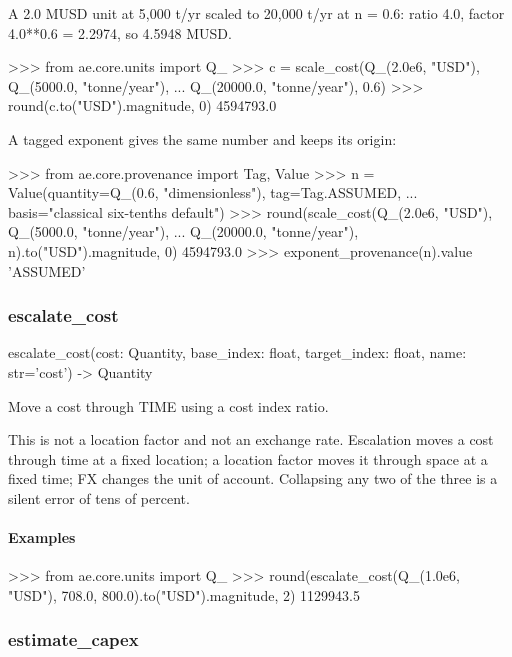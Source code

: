 \documentclass[10pt,a4paper,twoside]{report}
\begin{document}
A 2.0 MUSD unit at 5,000 t/yr scaled to 20,000 t/yr at n = 0.6: ratio 4.0, factor 4.0**0.6 = 2.2974, so 4.5948 MUSD.

\begin{doctestblock}
>>> from ae.core.units import Q_
>>> c = scale_cost(Q_(2.0e6, "USD"), Q_(5000.0, "tonne/year"),
...                Q_(20000.0, "tonne/year"), 0.6)
>>> round(c.to("USD").magnitude, 0)
4594793.0
\end{doctestblock}

A tagged exponent gives the same number and keeps its origin:

\begin{doctestblock}
>>> from ae.core.provenance import Tag, Value
>>> n = Value(quantity=Q_(0.6, "dimensionless"), tag=Tag.ASSUMED,
...           basis="classical six-tenths default")
>>> round(scale_cost(Q_(2.0e6, "USD"), Q_(5000.0, "tonne/year"),
...                  Q_(20000.0, "tonne/year"), n).to("USD").magnitude, 0)
4594793.0
>>> exponent_provenance(n).value
'ASSUMED'
\end{doctestblock}

\subsubsection*{escalate\_cost}

\begin{verbatimsmall}
escalate_cost(cost: Quantity, base_index: float, target_index: float, name: str='cost') -> Quantity
\end{verbatimsmall}

Move a cost through TIME using a cost index ratio.

This is not a location factor and not an exchange rate. Escalation moves a cost through time at a fixed location; a location factor moves it through space at a fixed time; FX changes the unit of account. Collapsing any two of the three is a silent error of tens of percent.

\paragraph*{Examples}

\begin{doctestblock}
>>> from ae.core.units import Q_
>>> round(escalate_cost(Q_(1.0e6, "USD"), 708.0, 800.0).to("USD").magnitude, 2)
1129943.5
\end{doctestblock}

\subsubsection*{estimate\_capex}
\end{document}

